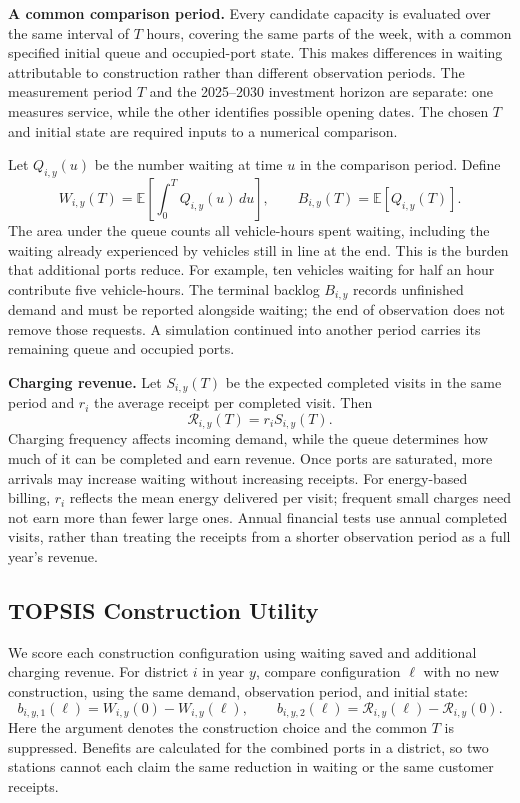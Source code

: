 \documentclass[12pt]{article}
\newcommand{\E}{\mathbb E}\newcommand{\ind}{\mathbf1}
\begin{document}
\textbf{A common comparison period.} Every candidate capacity is evaluated over the
same interval of $T$ hours, covering the same parts of the week, with a common specified
initial queue and occupied-port state. This makes differences in waiting attributable
to construction rather than different observation periods. The measurement period
$T$ and the 2025--2030 investment horizon are separate: one measures service, while
the other identifies possible opening dates. The chosen $T$ and initial state are
required inputs to a numerical comparison.

Let $Q_{i,y}(u)$ be the number waiting at time $u$ in the comparison period. Define
\begin{equation}
W_{i,y}(T)=\E\!\left[\int_0^T Q_{i,y}(u)\,du\right],\qquad
B_{i,y}(T)=\E[Q_{i,y}(T)].\label{eq:waiting}
\end{equation}
The area under the queue counts all vehicle-hours spent waiting, including the waiting
already experienced by vehicles still in line at the end. This is the burden that
additional ports reduce. For example, ten vehicles waiting for half an hour contribute
five vehicle-hours. The terminal backlog $B_{i,y}$ records unfinished demand and must
be reported alongside waiting; the end of observation does not remove those requests.
A simulation continued into another period carries its remaining queue and occupied ports.

\textbf{Charging revenue.} Let $S_{i,y}(T)$ be the expected completed visits in the
same period and $r_i$ the average receipt per completed visit. Then
\begin{equation}
\mathcal R_{i,y}(T)=r_iS_{i,y}(T).\label{eq:revenue}
\end{equation}
Charging frequency affects incoming demand, while the queue determines how much of it
can be completed and earn revenue. Once ports are saturated, more arrivals may increase
waiting without increasing receipts. For energy-based billing, $r_i$ reflects the mean
energy delivered per visit; frequent small charges need not earn more than fewer large
ones. Annual financial tests use annual completed visits, rather than treating the
receipts from a shorter observation period as a full year's revenue.

\subsection{TOPSIS Construction Utility}
\label{subsec:topsis}
We score each construction configuration using waiting saved and additional charging
revenue. For district $i$ in year $y$, compare configuration $\ell$ with no new construction,
using the same demand, observation period, and initial state:
\begin{equation}
b_{i,y,1}(\ell)=W_{i,y}(0)-W_{i,y}(\ell),\qquad
b_{i,y,2}(\ell)=\mathcal R_{i,y}(\ell)-\mathcal R_{i,y}(0).
\label{eq:benefits}
\end{equation}
Here the argument denotes the construction choice and the common $T$ is suppressed.
Benefits are calculated for the combined ports in a district, so two stations cannot
each claim the same reduction in waiting or the same customer receipts.
\end{document}

